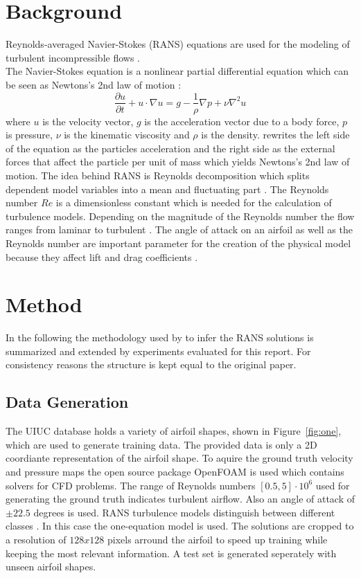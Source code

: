 \documentclass[acmtog]{techreportacmart}
\begin{document}
\section{Background}
Reynolds-averaged Navier-Stokes (RANS) equations are used for the modeling of turbulent incompressible flows \cite{Alfonsi}. \\
The Navier-Stokes equation is a nonlinear partial differential equation which can be seen as Newtons's 2nd law of motion \cite{BISTAFA2018}:
\begin{equation}
\label{eqn:01}
\frac{\partial{u}}{\partial{t}} + u \cdot \nabla u = g - \frac{1}{\rho} \nabla p + \nu \nabla^{2}u
\end{equation}
where $u$ is the velocity vector, $g$ is the acceleration vector due to a body force, $p$ is pressure, 
$\nu$ is the kinematic viscosity and $\rho$ is the density. \cite{BISTAFA2018} rewrites the left side of the equation as the particles acceleration and the right side as the external forces that affect the particle per unit of mass which yields Newtons's 2nd law of motion. The idea behind RANS is Reynolds decomposition which splits dependent model variables into a mean and fluctuating part \cite{Alfonsi}. The Reynolds number $Re$ is a dimensionless constant which is needed for the calculation of turbulence models. Depending on the magnitude of the Reynolds number the flow ranges from laminar to turbulent \cite{lissaman1983}. The angle of attack on an airfoil as well as the Reynolds number are important parameter for the creation of the physical model because they affect lift and drag coefficients \cite{lissaman1983}. 

\section{Method}
In the following the methodology used by \cite{Thuerey20} to infer the RANS solutions is summarized and extended by experiments evaluated for this report. For consistency reasons the structure is kept equal to the original paper.

\subsection{Data Generation}
The UIUC database \cite{airfoil} holds a variety of airfoil shapes, shown in Figure~\ref{fig:one}, which are used to generate training data. The provided data is only a 2D coordiante representation of the airfoil shape. To aquire the ground truth velocity and pressure maps the open source package OpenFOAM is used which contains solvers for CFD problems. The range of Reynolds numbers $[0.5, 5] \cdot 10^{6}$ used for generating the ground truth indicates turbulent airflow. Also an angle of attack of $\pm 22.5$ degrees is used. RANS turbulence models distinguish between different classes \cite{Alfonsi}. In this case the one-equation model is used. The solutions are cropped to a resolution of $128x128$ pixels arround the airfoil to speed up training while keeping the most relevant information. A test set is generated seperately with unseen airfoil shapes.
\end{document}
